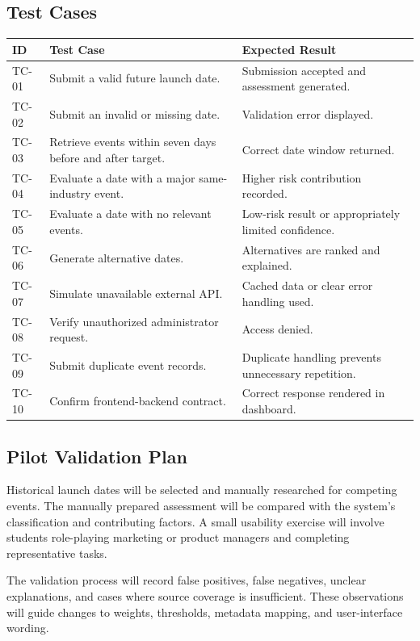 \documentclass[12pt]{article}
\begin{document}
\subsection{Test Cases}
\begin{longtable}{p{}p{}p{}}
\toprule
\textbf{ID} & \textbf{Test Case} & \textbf{Expected Result}\\
\midrule
TC-01 & Submit a valid future launch date. & Submission accepted and assessment generated.\\
TC-02 & Submit an invalid or missing date. & Validation error displayed.\\
TC-03 & Retrieve events within seven days before and after target. & Correct date window returned.\\
TC-04 & Evaluate a date with a major same-industry event. & Higher risk contribution recorded.\\
TC-05 & Evaluate a date with no relevant events. & Low-risk result or appropriately limited confidence.\\
TC-06 & Generate alternative dates. & Alternatives are ranked and explained.\\
TC-07 & Simulate unavailable external API. & Cached data or clear error handling used.\\
TC-08 & Verify unauthorized administrator request. & Access denied.\\
TC-09 & Submit duplicate event records. & Duplicate handling prevents unnecessary repetition.\\
TC-10 & Confirm frontend-backend contract. & Correct response rendered in dashboard.\\
\bottomrule
\end{longtable}

\subsection{Pilot Validation Plan}
Historical launch dates will be selected and manually researched for competing events. The manually prepared assessment will be compared with the system's classification and contributing factors. A small usability exercise will involve students role-playing marketing or product managers and completing representative tasks.

The validation process will record false positives, false negatives, unclear explanations, and cases where source coverage is insufficient. These observations will guide changes to weights, thresholds, metadata mapping, and user-interface wording.
\end{document}
